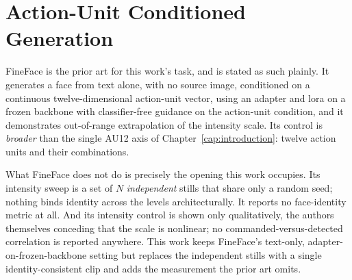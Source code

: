 \section{Action-Unit Conditioned Generation}\label{sec:rw-fineface}

%

FineFace \citep{varanka2024fineface} is the prior art for this work's task, and is stated as
such plainly. It generates a face from text alone, with no source image, conditioned on a
continuous twelve-dimensional action-unit vector, using an adapter and \gls{lora} on a frozen backbone with classifier-free guidance on the action-unit condition, and it demonstrates
out-of-range extrapolation of the intensity scale. Its control is \emph{broader} than the single
AU12 axis of Chapter~\ref{cap:introduction}: twelve action units and their combinations.

What FineFace does not do is precisely the opening this work occupies. Its intensity sweep is a
set of $N$ \emph{independent} stills that share only a random seed; nothing binds identity across
the levels architecturally. It reports no face-identity metric at all. And its intensity control
is shown only qualitatively, the authors themselves conceding that the scale is nonlinear; no
commanded-versus-detected correlation is reported anywhere. This work keeps FineFace's text-only,
adapter-on-frozen-backbone setting but replaces the independent stills with a single
identity-consistent clip and adds the measurement the prior art omits.

